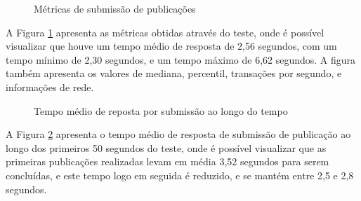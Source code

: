 \begin{figure}[H]
    \caption{Métricas de submissão de publicações}
    \label{fig:matrics-create-research}
\end{figure}

A Figura \ref{fig:matrics-create-research} apresenta as métricas obtidas através do
teste, onde é possível visualizar que houve um tempo médio de resposta de 2,56 segundos,
com um tempo mínimo de 2,30 segundos, e um tempo máximo de 6,62 segundos. A figura também
apresenta os valores de mediana, percentil, transações por segundo, e informações de rede.

\begin{figure}[H]
    \caption{Tempo médio de reposta por submissão ao longo do tempo}
    \centering
    \label{fig:create-response-over-time}
\end{figure}

A Figura \ref{fig:create-response-over-time} apresenta o tempo médio de resposta
de submissão de publicação ao longo dos primeiros 50 segundos do teste, onde é
possível visualizar que as primeiras publicações realizadas levam em média
3,52 segundos para serem concluídas, e este tempo logo em seguida é reduzido, e se
mantém entre 2,5 e 2,8 segundos.

